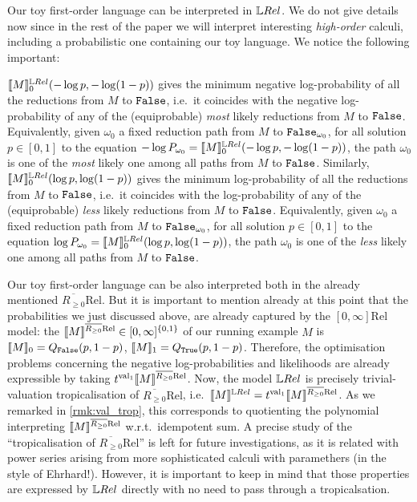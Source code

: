 Our toy first-order language can be interpreted in $\LREL$.
We do not give details now since in the rest of the paper we will interpret interesting \emph{high-order} calculi, including a probabilistic one containing our toy language.
We notice the following important:

\begin{remark}\label{rmk:tropof01Rel}
$\model{M}^{\LREL}_0(-\log p,-\log (1-p))$ gives the minimum negative log-probability of all the reductions from $M$ to $\mathtt{False}$, i.e.\ it coincides with the  negative log-probability of any of the (equiprobable) \emph{most} likely reductions from $M$ to $\mathtt{False}$.
Equivalently, given $\omega_0$ a fixed reduction path from $M$ to $\mathtt{False}_{\omega_0}$, for all solution $p\in[0,1]$ to the equation $%
-\log  P_{\omega_0} = \model{M}^{\LREL}_0(-\log p,-\log (1-p))$, the path $\omega_0$ is one of the \emph{most} likely one among all paths from $M$ to $\mathtt{False}$.
Similarly, $\model{M}^{\LREL}_0(\log p,\log (1-p))$ gives the minimum log-probability of all the reductions from $M$ to $\mathtt{False}$, i.e.\ it coincides with the log-probability of any of the (equiprobable) \emph{less} likely reductions from $M$ to $\mathtt{False}$.
Equivalently, given $\omega_0$ a fixed reduction path from $M$ to $\mathtt{False}_{\omega_0}$, for all solution $p\in[0,1]$ to the equation $%
\log  P_{\omega_0} = \model{M}^{\LREL}_0(\log p,\log (1-p))$, the path $\omega_0$ is one of the \emph{less} likely one among all paths from $M$ to $\mathtt{False}$.
\end{remark}

\begin{remark}
Our toy first-order language can be also interpreted both in the already mentioned $\overline{R_{\geq 0}}\mathrm{Rel}$.
But it is important to mention already at this point that the probabilities we just discussed above, are already captured by the $[0,\infty]\mathrm{Rel}$ model: the $\llbracket M\rrbracket^{\overline{R_{\geq 0}}\mathrm{Rel}}\in[0,\infty]^{\{0,1\}}$ of our running example $M$ is $\llbracket M\rrbracket_0=Q_{\mathtt{False}}(p,1-p)$, $\llbracket M\rrbracket_1=Q_{\mathtt{True}}(p,1-p)$.
Therefore, the optimisation problems concerning the negative log-probabilities and likelihoods are already expressible by taking $\trop^{\mathrm{val}_1}\model{M}^{\overline{R_{\geq 0}}\mathrm{Rel}}$. 
Now, the model $\LREL$ is precisely trivial-valuation tropicalisation of $\overline{R_{\geq 0}}\mathrm{Rel}$, i.e.\ $\model{M}^{\LREL}=\trop^{\mathrm{val}_1}\model{M}^{\overline{R_{\geq 0}}\mathrm{Rel}}$.
As we remarked in \autoref{rmk:val_trop}, this corresponds to quotienting the polynomial interpreting $\llbracket M\rrbracket^{\overline{R_{\geq 0}}\mathrm{Rel}}$ w.r.t.\ idempotent sum.
A precise study of the ``tropicalisation of $\overline{R_{\geq 0}}\mathrm{Rel}$'' is left for future investigations, as it is related with power series arising from more sophisticated calculi with paramethers (in the style of \cite{} {\color{red}Ehrhard!}).
However, it is important to keep in mind that those properties are expressed by $\LREL$ directly with no need to pass through a tropicalsation.
\end{remark}

